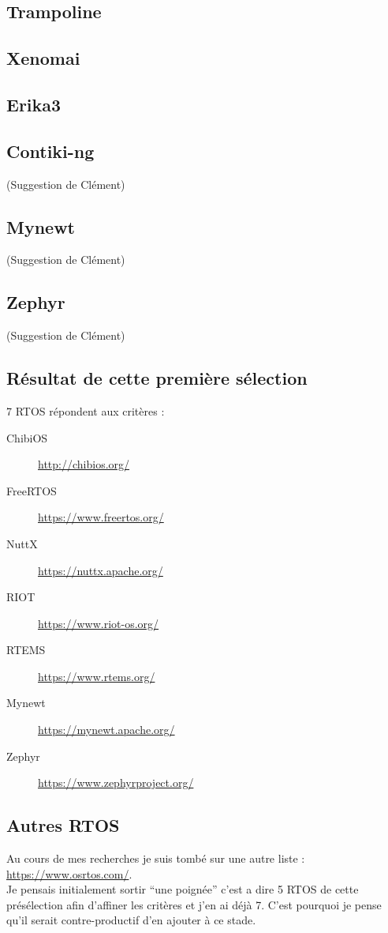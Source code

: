 \subsection{Trampoline}


\subsection{Xenomai}


\subsection{Erika3}


\subsection{Contiki-ng}
(Suggestion de Clément)


\subsection{Mynewt}
(Suggestion de Clément)


\subsection{Zephyr}
(Suggestion de Clément)


\subsection{Résultat de cette première sélection}
7 RTOS répondent aux critères :
\begin{description}
	\item[ChibiOS] \url{http://chibios.org/}
	\item[FreeRTOS] \url{https://www.freertos.org/}
	\item[NuttX] \url{https://nuttx.apache.org/}
	\item[RIOT] \url{https://www.riot-os.org/}
	\item[RTEMS] \url{https://www.rtems.org/}
	\item[Mynewt] \url{https://mynewt.apache.org/}
	\item[Zephyr] \url{https://www.zephyrproject.org/}
\end{description}

\subsection{Autres RTOS}
Au cours de mes recherches je suis tombé sur une autre liste :\\
\url{https://www.osrtos.com/}.\\

Je pensais initialement sortir \enquote{une poignée} c'est a dire 5 RTOS de cette 
présélection afin d'affiner les critères et j'en ai déjà 7. C'est pourquoi je pense
qu'il serait contre-productif d'en ajouter à ce stade.
